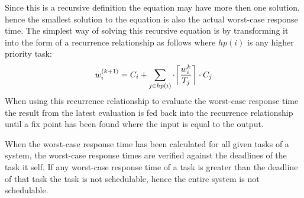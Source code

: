 Since this is a recursive definition the equation may have more then one solution, hence the smallest solution to the equation is also the actual worst-case response time. 
The simplest way of solving this recursive equation is by transforming it into the form of a recurrence relationship as follows where $hp(i)$ is any higher priority task:
\begin{equation}
w^{(k+1)}_{i} = C_i + \sum_{j\in hp(i)} \cdot \ceil*{\frac{w^{k}_{i}}{T_j}} \cdot C_j
\end{equation}
When using this recurrence relationship to evaluate the worst-case response time the result from the latest evaluation is fed back into the recurrence relationship until a fix point has been found where the input is equal to the output. 

When the worst-case response time has been calculated for all given tasks of a system, the worst-case response times are verified against the deadlines of the task it self.
If any worst-case response time of a task is greater than the deadline of that task the task is not schedulable, hence the entire system is not schedulable. 